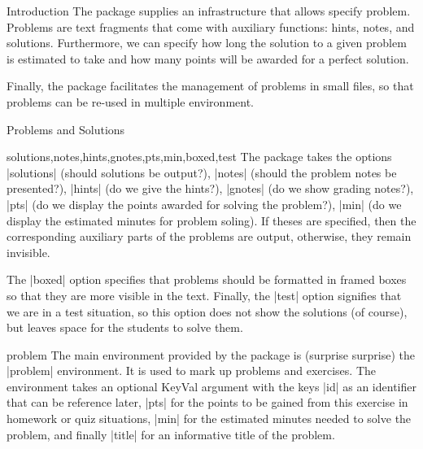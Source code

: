 \begin{sfragment}{Introduction}
  The  package supplies an infrastructure that allows specify problem.
  Problems are text fragments that come with auxiliary functions: hints, notes, and
  solutions. Furthermore, we can specify how long the solution to a given problem is
  estimated to take and how many points will be awarded for a perfect solution.

Finally, the  package facilitates the management of problems in small files,
so that problems can be re-used in multiple environment. 
\end{sfragment}


\begin{sfragment}{Problems and Solutions}
  
\begin{function}{solutions,notes,hints,gnotes,pts,min,boxed,test}
  The  package takes the options |solutions| (should solutions be output?),
  |notes| (should the problem notes be presented?), |hints| (do we give the hints?),
  |gnotes| (do we show grading notes?), |pts| (do we display the points awarded for
  solving the problem?), |min| (do we display the estimated minutes for problem
  soling). If theses are specified, then the corresponding auxiliary parts of the problems
  are output, otherwise, they remain invisible.

  The |boxed| option specifies that problems should be formatted in framed boxes so that
  they are more visible in the text. Finally, the |test| option signifies that we are in a
  test situation, so this option does not show the solutions (of course), but leaves space
  for the students to solve them.
\end{function}

\begin{environment}{problem}
  The main environment provided by the package is (surprise surprise) the
  |problem| environment. It is used to mark up problems and exercises. The environment
  takes an optional KeyVal argument with the keys |id| as an identifier that can be
  reference later, |pts| for the points to be gained from this exercise in homework or
  quiz situations, |min| for the estimated minutes needed to solve the problem, and
  finally |title| for an informative title of the problem.
\end{environment}

\end{sfragment}
